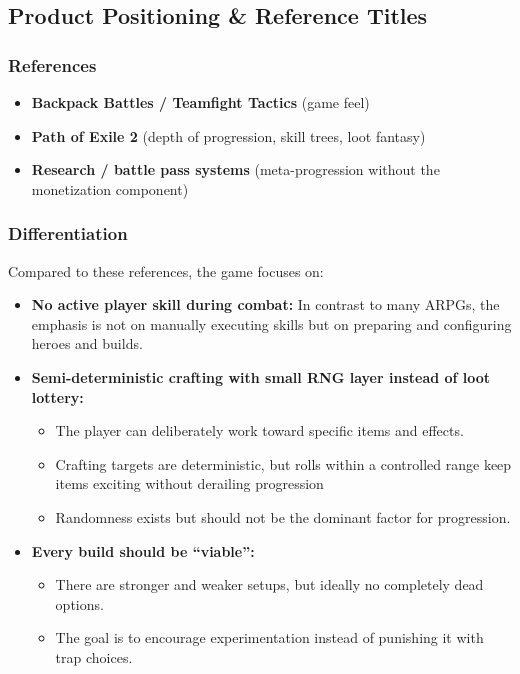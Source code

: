 
\subsection{Product Positioning \& Reference Titles}

\subsubsection*{References}

\begin{itemize}
	\item \textbf{Backpack Battles / Teamfight Tactics} (game feel)
	\item \textbf{Path of Exile 2} (depth of progression, skill trees, loot fantasy)
	\item \textbf{Research / battle pass systems} (meta-progression without the monetization component)
\end{itemize}

\subsubsection*{Differentiation}

Compared to these references, the game focuses on:

\begin{itemize}
	\item \textbf{No active player skill during combat:} In contrast to many ARPGs, the emphasis is not on manually executing skills but on preparing and configuring heroes and builds.
	\item \textbf{Semi-deterministic crafting with small RNG layer instead of loot lottery:} 
	\begin{itemize}
		\item The player can deliberately work toward specific items and effects.
		\item Crafting targets are deterministic, but rolls within a controlled range keep items exciting without derailing progression
		\item Randomness exists but should not be the dominant factor for progression.
	\end{itemize}
	\item \textbf{Every build should be “viable”:} 
	\begin{itemize}
		\item There are stronger and weaker setups, but ideally no completely dead options.
		\item The goal is to encourage experimentation instead of punishing it with trap choices.
	\end{itemize}
\end{itemize}

